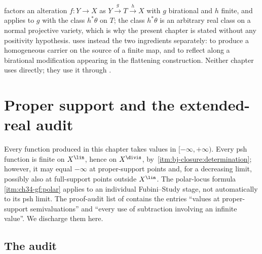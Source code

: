 \begin{remark}
\label{rem:ch39-downstream}
 factors an alteration $f:Y\to X$ as
$Y\xrightarrow{g}T\xrightarrow{h}X$ with $g$ birational and $h$
finite, and applies  to $g$ with the
class $h^*\theta$ on $T$; the class $h^*\theta$ is an arbitrary real
class on a normal projective variety, which is why the present chapter is
stated without any positivity hypothesis.
 uses instead the two ingredients separately:
 to produce a homogeneous carrier on the
source of a finite map, and  to reflect
along a birational modification appearing in the flattening construction.
Neither chapter uses  directly; they use
it through .
\end{remark}

\section{Proper support and the extended-real audit}
\label{sec:ch39-safeguards}

Every function produced in this chapter takes values in
$[-\infty,+\infty)$.  Every psh function is finite on
$X^{\lin}$, hence on $X^{\divis}$, by
\,\cref{itm:bj-closure:determination}; however,
it may equal $-\infty$ at proper-support points and, for a decreasing
limit, possibly also at full-support points outside $X^{\lin}$.
The polar-locus formula
\,\cref{itm:ch34-gf:polar} applies to an
individual Fubini--Study stage, not automatically to its psh limit.  The
proof-audit list of  contains the entries
``values at proper-support semivaluations'' and ``every use of subtraction
involving an infinite value''.  We discharge them here.

\subsection{The audit}
\label{sec:ch39-audit}

